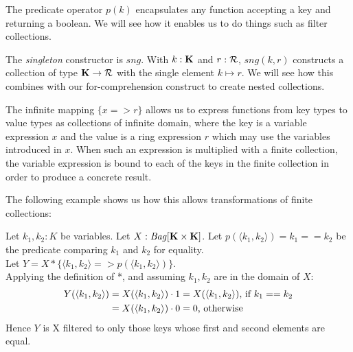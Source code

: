 {{{\vs The predicate operator $p(k)$ encapsulates any function accepting a key and returning a boolean. We will see how it enables us to do things such as filter collections.
 
\vs The \textit{singleton} constructor is $sng$. With $k: \mathbf{K}$ and $r: \mathcal{R}$, $sng(k,r)$ constructs a collection of type $\mathbf{K} \rightarrow \mathcal{R}$ with the single element $k  \mapsto r$. We will see how this combines with our for-comprehension construct to create nested collections.
 
\vs The infinite mapping $\{x => r\}$ allows us to express functions from key types to value types as collections of infinite domain, where the key is a variable expression $x$ and the value is a ring expression $r$ which may use the variables introduced in $x$. When such an expression is multiplied with a finite collection, the variable expression is bound to each of the keys in the finite collection in order to produce a concrete result.

The following example shows us how this allows transformations of finite collections:

\noindent Let $k_1,k_2: K$ be variables. Let $X: \textrm{\textit{Bag}}[\mathbf{K} \times \mathbf{K}]$. Let $p(\langle k_1, k_2 \rangle) = k_1 == k_2$ be the predicate comparing $k_1$ and $k_2$ for equality. \\
Let $Y = X * \{\langle k_1, k_2 \rangle => p(\langle k_1, k_2 \rangle)\}$. \\ Applying the definition of *, and assuming $k_1,k_2$ are in the domain of $X$: \\
\begin{equation*}
\begin{split}
Y(\langle k_1, k_2 \rangle) &= X(\langle k_1, k_2 \rangle) \cdot 1 = X(\langle k_1, k_2 \rangle)\textrm{, if } k_1 == k_2 \\
&= X(\langle k_1, k_2 \rangle) \cdot 0 = 0\textrm{, otherwise}
\end{split}
\end{equation*}
Hence $Y$ is X filtered to only those keys whose first and second elements are equal.

}}}
